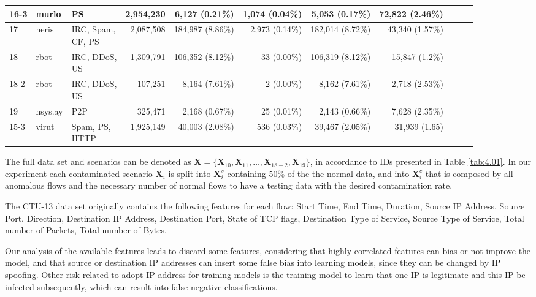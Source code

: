 \begin{table}[h!]
\begin{tabular}{| l | l | l | r | r | r | r | r | r | r | r | }
			16-3 & murlo &PS & 2,954,230 & 6,127 (0.21\%) & 1,074 (0.04\%) & 5,053 (0.17\%) &72,822 (2.46\%)\\ \hline
			17 & neris &\makecell[l]{IRC, Spam,\\CF, PS} & 2,087,508 & 184,987 (8.86\%) & 2,973 (0.14\%) & 182,014 (8.72\%) &43,340 (1.57\%)\\ \hline
			18 & rbot &\makecell[l]{IRC, DDoS,\\US} & 1,309,791 & 106,352 (8.12\%) & 33 (0.00\%) & 106,319 (8.12\%) &15,847 (1.2\%)\\ \hline
			18-2 & rbot &\makecell[l]{IRC, DDoS,\\US} & 107,251 & 8,164 (7.61\%) & 2 (0.00\%) & 8,162 (7.61\%) &2,718 (2.53\%)\\ \hline
			19 & nsys.ay &P2P & 325,471 & 2,168 (0.67\%) & 25 (0.01\%) & 2,143 (0.66\%) &7,628 (2.35\%)\\ \hline
			15-3 & virut &\makecell[l]{Spam, PS,\\HTTP} & 1,925,149 & 40,003 (2.08\%) & 536 (0.03\%) & 39,467 (2.05\%) &31,939 (1.65)\\ \hline
	\end{tabular}
\end{table}

The full data set and scenarios can be denoted as $\pmb{X} = \{\pmb{X}_{10}, \pmb{X}_{11}, \ldots , \pmb{X}_{18-2}, \pmb{X}_{19}\}$, in accordance to IDs presented in Table \ref{tab:4.01}. In our experiment each contaminated scenario $\pmb{X}_i$ is split into $\pmb{X}_i^s$ containing 50\% of the the normal data, and into $\pmb{X}_i^c$ that is composed by all anomalous flows and the necessary number of normal flows to have a testing data with the desired contamination rate.

The CTU-13 data set originally contains the following features for each flow: Start Time, End Time, Duration, Source IP Address, Source Port. Direction, Destination IP Address, Destination Port, State of TCP flags, Destination Type of Service, Source Type of Service, Total number of Packets, Total number of Bytes.

Our analysis of the available features leads to discard some features, considering that highly correlated features can bias or not improve the model, and that source or destination IP addresses can insert some false bias into learning models, since they can be changed by IP spoofing. Other risk related to adopt IP address for training models is the training model to learn that
one IP is legitimate and this IP be infected subsequently, which can result into false negative classifications.

